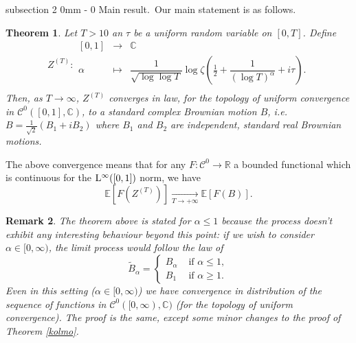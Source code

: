 \documentclass{article}
\makeatletter
\newcommand{\1}{\mathds{1}}
\numberwithin{equation}{section}
\renewcommand{\leq}{\leqslant}
\renewcommand{\geq}{\geqslant}
\newcommand{\E}{\mathbb{E}}
\newcommand{\R}{\mathbb{R}}
\newcommand{\C}{\mathbb{C}}
\theoremstyle{plain} %
\newtheorem{theorem}{Theorem}[section]
\newtheorem{remark}[theorem]{Remark}
\renewcommand{\subsection}{\@startsection
{subsection}%
{2}%
{0mm}%
{-\baselineskip}%
{0 \baselineskip}%
{\normalfont\bf\itshape}} %
\newcommand{\hf}{\frac{1}{2}}
\makeatother
\begin{document}
\subsection{Main result.}\ 
Our main statement is as follows.

\begin{theorem}
\label{mainthm}
    Let  $T > 10$ an $\tau$ be a uniform random variable on $[0, T]$. Define
\begin{displaymath}
Z^{(T)}:
\left.
  \begin{array}{rcl}
    [0, 1] & \longrightarrow &\C \\
    \alpha & \longmapsto & \dfrac{1}{\sqrt{\log \log T}} \log \zeta (\hf + \dfrac{1}{(\log T)^{\alpha}} + i \tau). \\
  \end{array}
\right.
\end{displaymath}
Then, as $T \rightarrow \infty$, $Z^{(T)}$ converges in law,  for the topology of uniform convergence in $\mathcal{C}^0([0,1], \C)$, to a standard complex Brownian motion $B$, i.e. 
$B=\tfrac{1}{\sqrt{2}}(B_1+iB_2)$ where $B_1$ and $B_2$ are independent,  standard real Brownian motions. 
\end{theorem}
\noindent The above convergence means that for any  $F: \mathcal{C}^0 \to \R$ a bounded functional which is continuous for the ${\rm L}^\infty([0,1])$ norm,  we have
\begin{equation}
    \E[F(Z^{(T)})] \underset{T \to + \infty}{\longrightarrow} \E[F(B)].
\end{equation}
\begin{remark} \label{exttoline}
  The theorem above is stated for $\alpha \leq 1$ because the process doesn't exhibit any interesting behaviour beyond this point: if we wish to consider $\alpha \in [0, \infty)$, the limit process would follow the law of 
\begin{equation} \label{defbtilde}
    {\tilde B}_\alpha  = \begin{cases}
    B_\alpha & \text{ if } \alpha \leq 1,\\
    B_1 & \text{ if } \alpha \geq 1.
\end{cases}
\end{equation}
Even in this setting ($\alpha \in [0, \infty)$) we have convergence in distribution of the sequence of functions in $\mathcal{C}^0([0, \infty), \C)$ (for the topology of uniform convergence). The proof is the same,  except some minor changes to the proof of Theorem \ref{kolmo}.
\end{remark}
\end{document}
